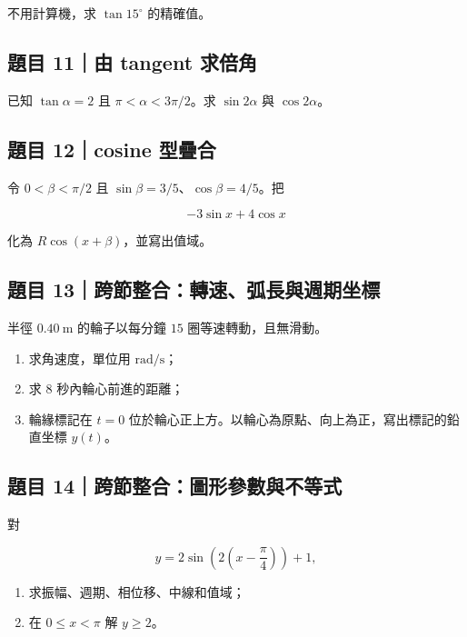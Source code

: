 \documentclass[11pt,a4paper]{article}
\providecommand{\tightlist}{%
  \setlength{\itemsep}{0pt}\setlength{\parskip}{0pt}}
\begin{document}
不用計算機，求 \(\tan15^\circ\) 的精確值。

\subsection{題目 11｜由 tangent 求倍角}\label{ux984cux76ee-11ux7531-tangent-ux6c42ux500dux89d2}

已知 \(\tan\alpha=2\) 且 \(\pi<\alpha<3\pi/2\)。求 \(\sin2\alpha\) 與 \(\cos2\alpha\)。

\subsection{題目 12｜cosine 型疊合}\label{ux984cux76ee-12cosine-ux578bux758aux5408}

令 \(0<\beta<\pi/2\) 且 \(\sin\beta=3/5\)、\(\cos\beta=4/5\)。把

\[
-3\sin x+4\cos x
\]

化為 \(R\cos(x+\beta)\)，並寫出值域。

\subsection{題目 13｜跨節整合：轉速、弧長與週期坐標}\label{ux984cux76ee-13ux8de8ux7bc0ux6574ux5408ux8f49ux901fux5f27ux9577ux8207ux9031ux671fux5750ux6a19}

半徑 \(0.40\ \mathrm m\) 的輪子以每分鐘 \(15\) 圈等速轉動，且無滑動。

\begin{enumerate}
\def\labelenumi{\arabic{enumi}.}
\tightlist
\item
  求角速度，單位用 \(\mathrm{rad/s}\)；
\item
  求 \(8\) 秒內輪心前進的距離；
\item
  輪緣標記在 \(t=0\) 位於輪心正上方。以輪心為原點、向上為正，寫出標記的鉛直坐標 \(y(t)\)。
\end{enumerate}

\subsection{題目 14｜跨節整合：圖形參數與不等式}\label{ux984cux76ee-14ux8de8ux7bc0ux6574ux5408ux5716ux5f62ux53c3ux6578ux8207ux4e0dux7b49ux5f0f}

對

\[
y=2\sin\left(2\left(x-\frac\pi4\right)\right)+1,
\]

\begin{enumerate}
\def\labelenumi{\arabic{enumi}.}
\tightlist
\item
  求振幅、週期、相位移、中線和值域；
\item
  在 \(0\le x<\pi\) 解 \(y\ge2\)。
\end{enumerate}
\end{document}
